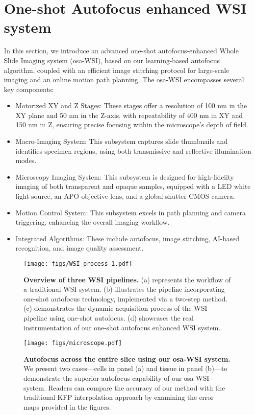 \section{One-shot Autofocus enhanced WSI system}
\label{sec:wsi}

In this section, we introduce an advanced one-shot autofocus-enhanced Whole Slide Imaging system (osa-WSI), based on our learning-based autofocus algorithm, coupled with an efficient image stitching protocol for large-scale imaging and an online motion path planning. The osa-WSI encompasses several key components: 

\begin{itemize}
\item Motorized XY and Z Stages: These stages offer a resolution of 100 nm in the XY plane and 50 nm in the Z-axis, with repeatability of 400 nm in XY and 150 nm in Z, ensuring precise focusing within the microscope's depth of field.
\item Macro-Imaging System: This subsystem captures slide thumbnails and identifies specimen regions,  using both transmissive and reflective illumination modes. 
\item Microscopy Imaging System: This subsystem is designed for high-fidelity imaging of both transparent and opaque samples, equipped with a LED white light source, an APO objective lens, and a global shutter CMOS camera.
\item Motion Control System: This subsystem excels in path planning and camera triggering, enhancing the overall imaging workflow.
\item Integrated Algorithms: These include autofocus, image stitching, AI-based recognition, and image quality assessment.
\end{itemize}

\begin{figure}[H]
	\centering
	\texttt{[image: figs/WSI\_process\_1.pdf]}
	\caption{\textbf{Overview of three WSI pipelines.} (a) represents the workflow of a traditional WSI system. (b) illustrates the pipeline incorporating one-shot autofocus technology, implemented via a two-step method. (c) demonstrates the dynamic acquisition process of the WSI pipeline using one-shot autofocus. (d) showcases the real instrumentation of our one-shot autofocus enhanced WSI system.
    }
	\label{fig:net}
\end{figure}

\begin{figure}[H]
	\centering
	\texttt{[image: figs/microscope.pdf]}
    \caption{\textbf{Autofocus across the entire slice using our osa-WSI system.}  We present two cases—cells in panel (a) and tissue in panel (b)—to demonstrate the superior autofocus capability of our osa-WSI system. Readers can compare the accuracy of our method with the traditional KFP interpolation approach by examining the error maps provided in the figures.}
	\label{fig:wsi}
\end{figure}

